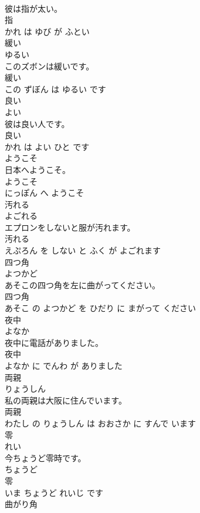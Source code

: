 \documentclass[8pt]{extreport}
\begin{document}
\begin{CJK}{UTF8}{min}
\\	彼は指が太い。	
\\	指 
\\	かれ は ゆび が ふとい			
\\	緩い	
\\	ゆるい			
\\	このズボンは緩いです。	
\\	緩い 
\\	この ずぼん は ゆるい です			
\\	良い	
\\	よい			
\\	彼は良い人です。	
\\	良い 
\\	かれ は よい ひと です			
\\	ようこそ	
\\	日本へようこそ。	
\\	ようこそ 
\\	にっぽん へ ようこそ			
\\	汚れる	
\\	よごれる			
\\	エプロンをしないと服が汚れます。	
\\	汚れる 
\\	えぷろん を しない と ふく が よごれます			
\\	四つ角	
\\	よつかど			
\\	あそこの四つ角を左に曲がってください。	
\\	四つ角 
\\	あそこ の よつかど を ひだり に まがって ください			
\\	夜中	
\\	よなか			
\\	夜中に電話がありました。	
\\	夜中 
\\	よなか に でんわ が ありました			
\\	両親	
\\	りょうしん			
\\	私の両親は大阪に住んでいます。	
\\	両親 
\\	わたし の りょうしん は おおさか に すんで います			
\\	零	
\\	れい			
\\	今ちょうど零時です。	
\\	ちょうど 
\\	零 
\\	いま ちょうど れいじ です			
\\	曲がり角	

\end{CJK}
\end{document}

